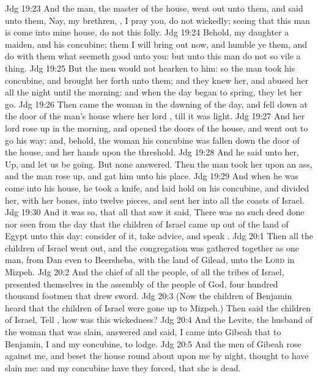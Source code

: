 \vs Jdg 19:23 And the man, the master of the house, went out unto them, and said unto them, Nay, my brethren, , I pray you, do not  wickedly; seeing that this man is come into mine house, do not this folly.
\vs Jdg 19:24 Behold,  my daughter a maiden, and his concubine; them I will bring out now, and humble ye them, and do with them what seemeth good unto you: but unto this man do not so vile a thing.
\vs Jdg 19:25 But the men would not hearken to him: so the man took his concubine, and brought her forth unto them; and they knew her, and abused her all the night until the morning: and when the day began to spring, they let her go.
\vs Jdg 19:26 Then came the woman in the dawning of the day, and fell down at the door of the man's house where her lord , till it was light.
\vs Jdg 19:27 And her lord rose up in the morning, and opened the doors of the house, and went out to go his way: and, behold, the woman his concubine was fallen down  the door of the house, and her hands  upon the threshold.
\vs Jdg 19:28 And he said unto her, Up, and let us be going. But none answered. Then the man took her  upon an ass, and the man rose up, and gat him unto his place.
\vs Jdg 19:29 And when he was come into his house, he took a knife, and laid hold on his concubine, and divided her,  with her bones, into twelve pieces, and sent her into all the coasts of Israel.
\vs Jdg 19:30 And it was so, that all that saw it said, There was no such deed done nor seen from the day that the children of Israel came up out of the land of Egypt unto this day: consider of it, take advice, and speak .
\vs Jdg 20:1 Then all the children of Israel went out, and the congregation was gathered together as one man, from Dan even to Beersheba, with the land of Gilead, unto the \textsc{Lord} in Mizpeh.
\vs Jdg 20:2 And the chief of all the people,  of all the tribes of Israel, presented themselves in the assembly of the people of God, four hundred thousand footmen that drew sword.
\vs Jdg 20:3 (Now the children of Benjamin heard that the children of Israel were gone up to Mizpeh.) Then said the children of Israel, Tell , how was this wickedness?
\vs Jdg 20:4 And the Levite, the husband of the woman that was slain, answered and said, I came into Gibeah that  to Benjamin, I and my concubine, to lodge.
\vs Jdg 20:5 And the men of Gibeah rose against me, and beset the house round about upon me by night,  thought to have slain me: and my concubine have they forced, that she is dead.
